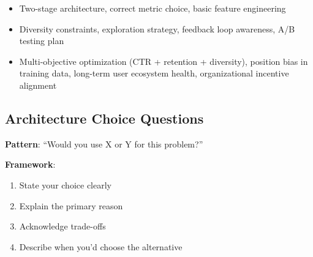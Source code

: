 \begin{interviewq}

\goodgreat
\begin{itemize}
    \item {} Two-stage architecture, correct metric choice, basic feature engineering
    \item {} Diversity constraints, exploration strategy, feedback loop awareness, A/B testing plan
    \item {} Multi-objective optimization (CTR + retention + diversity), position bias in training data, long-term user ecosystem health, organizational incentive alignment
\end{itemize}

\end{interviewq}

\subsection{Architecture Choice Questions}

\textbf{Pattern}: ``Would you use X or Y for this problem?''

\textbf{Framework}:
\begin{enumerate}
    \item State your choice clearly
    \item Explain the primary reason
    \item Acknowledge trade-offs
    \item Describe when you'd choose the alternative
\end{enumerate}


